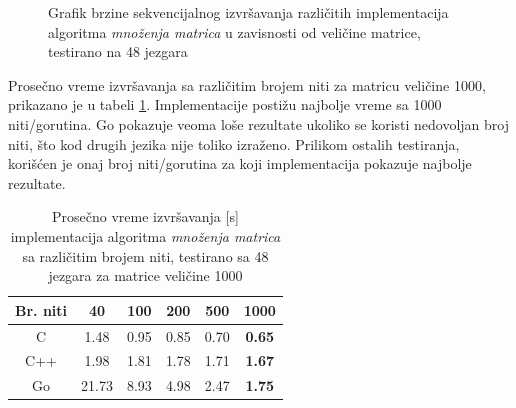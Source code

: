 \documentclass[12pt,oneside]{memoir}
\begin{document}
\begin{figure}
\begin{center}


\caption{Grafik brzine sekvencijalnog izvršavanja različitih implementacija algoritma \textit{množenja matrica} u zavisnosti od veličine matrice, testirano na 48 jezgara}
\label{fig:matrix11}
\end{center}
\end{figure}

Prosečno vreme izvršavanja sa različitim brojem niti za matricu veličine 1000, prikazano je u tabeli \ref{tab:matrix5}. Implementacije postižu najbolje vreme sa 1000 niti/gorutina. Go pokazuje veoma loše rezultate ukoliko se koristi nedovoljan broj niti, što kod drugih jezika nije toliko izraženo. Prilikom ostalih testiranja, korišćen je onaj broj niti/gorutina za koji implementacija pokazuje najbolje rezultate. 

\begin{table}
\begin{center}
\caption{Prosečno vreme izvršavanja [s] implementacija algoritma \textit{množenja matrica} sa različitim brojem niti, testirano sa 48 jezgara za matrice veličine 1000}
\begin{tabular}{||c||c c c c c||}
\hline
Br. niti		&40&100 &200 &500 &1000\\ \hline
C		&1.48		&0.95		&0.85		&0.70		&\textbf{0.65} \\ \hline
C++ 		&1.98		&1.81		&1.78		&1.71		&\textbf{1.67} \\ \hline
Go		&21.73	&8.93		&4.98		&2.47		&\textbf{1.75} \\ \hline
\end{tabular}
\label{tab:matrix5}
\end{center}
\end{table}
\end{document}
